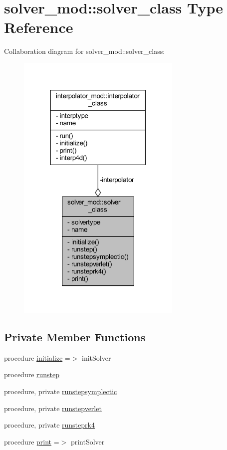 \hypertarget{structsolver__mod_1_1solver__class}{}\section{solver\+\_\+mod\+:\+:solver\+\_\+class Type Reference}
\label{structsolver__mod_1_1solver__class}


Collaboration diagram for solver\+\_\+mod\+:\+:solver\+\_\+class\+:
\nopagebreak
\begin{figure}[H]
\begin{center}
\leavevmode
\includegraphics[width=223pt]{structsolver__mod_1_1solver__class__coll__graph}
\end{center}
\end{figure}
\subsection*{Private Member Functions}
\begin{DoxyCompactItemize}
\item 
procedure \mbox{\hyperlink{structsolver__mod_1_1solver__class_a9ac72acd3e4fbb8881c7eaabe9e3d585}{initialize}} =$>$ init\+Solver
\item 
procedure \mbox{\hyperlink{structsolver__mod_1_1solver__class_a54ee0f169b626d3fb484d79cce91c3be}{runstep}}
\item 
procedure, private \mbox{\hyperlink{structsolver__mod_1_1solver__class_a5a6bdb2ea0ab6adb0c1ef29b7c4c02a6}{runstepsymplectic}}
\item 
procedure, private \mbox{\hyperlink{structsolver__mod_1_1solver__class_a0e32c00f2a75c3701f66f83d4682bc6f}{runstepverlet}}
\item 
procedure, private \mbox{\hyperlink{structsolver__mod_1_1solver__class_a58c86ed273b0b9141e74cc55b59377a3}{runsteprk4}}
\item 
procedure \mbox{\hyperlink{structsolver__mod_1_1solver__class_ac61135f89371079744ac9b5fd8da8a41}{print}} =$>$ print\+Solver
\end{DoxyCompactItemize}
